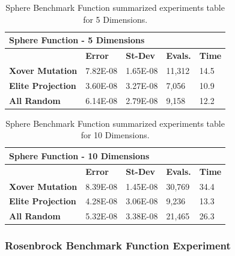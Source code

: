 \documentclass[graybox]{svmult}
\begin{document}
            \begin{table}[]
                \scriptsize
                \centering
                \caption{Sphere Benchmark Function summarized experiments table for 5 Dimensions.}\label{tab.fun_sphere5}
                \begin{tabular}{@{}lllll@{}}
                \toprule
                \multicolumn{5}{l}{\textbf{Sphere Function - 5 Dimensions}} \\ \midrule
                & \textbf{Error} & \textbf{St-Dev} & \textbf{Evals.} & \textbf{Time} \\
                \textbf{Xover Mutation} & 7.82E-08 & 1.65E-08 & 11,312 & 14.5 \\
                \textbf{Elite Projection} & 3.60E-08 & 3.27E-08 & 7,056 & 10.9 \\
                \textbf{All Random} & 6.14E-08 & 2.79E-08 & 9,158 & 12.2 \\ \bottomrule
                \end{tabular}
                \end{table}

            \begin{table}[]
                \scriptsize
                \centering
                \caption{Sphere Benchmark Function summarized experiments table for 10 Dimensions.}\label{tab.fun_sphere10}
                \begin{tabular}{@{}lllll@{}}
                \toprule
                \multicolumn{5}{l}{\textbf{Sphere Function - 10 Dimensions}} \\ \midrule
                & \textbf{Error} & \textbf{St-Dev} & \textbf{Evals.} & \textbf{Time} \\
                \textbf{Xover Mutation} & 8.39E-08 & 1.45E-08 & 30,769 & 34.4 \\
                \textbf{Elite Projection} & 4.28E-08 & 3.06E-08 & 9,236 & 13.3 \\
                \textbf{All Random} & 5.32E-08 & 3.38E-08 & 21,465 & 26.3 \\ \bottomrule
                \end{tabular}
                \end{table}

            \FloatBarrier


        \subsubsection{Rosenbrock Benchmark Function Experiment}
\end{document}
